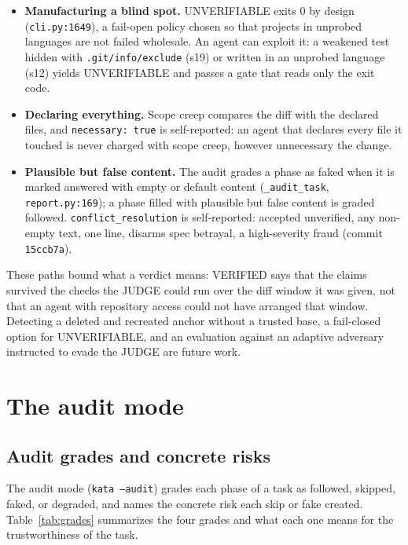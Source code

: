 \documentclass{sbc2019}%
\begin{document}
\begin{itemize}
not close the anchor rewrite above, which we re-ran against it and
which still yielded VERIFIED at that commit.
\item \textbf{Manufacturing a blind spot.} UNVERIFIABLE exits 0 by design
(\texttt{cli.py:1649}), a fail-open policy chosen so that projects in
unprobed languages are not failed wholesale. An agent can exploit it: a
weakened test hidden with \texttt{.git/info/exclude} (s19) or written in an
unprobed language (s12) yields UNVERIFIABLE and passes a gate that reads only
the exit code.
\item \textbf{Declaring everything.} Scope creep compares the diff with the
declared files, and \texttt{necessary: true} is self-reported: an agent that
declares every file it touched is never charged with scope creep, however
unnecessary the change.
\item \textbf{Plausible but false content.} The audit grades a phase as faked
when it is marked answered with empty or default content
(\texttt{\_audit\_task}, \texttt{report.py:169}); a phase filled with
plausible but false content is graded followed. \texttt{conflict\_resolution} is self-reported: accepted unverified, any non-empty
text, one line, disarms spec betrayal, a high-severity fraud
(commit \texttt{15ccb7a}).
\end{itemize}

These paths bound what a verdict means: VERIFIED says that the claims
survived the checks the JUDGE could run over the diff window it was given,
not that an agent with repository access could not have arranged that
window. Detecting a deleted and recreated anchor without a trusted base, a
fail-closed option for UNVERIFIABLE, and an evaluation against an
adaptive adversary instructed to evade the JUDGE are future work.

\section{The audit mode}
\label{sec:audit}

\subsection{Audit grades and concrete risks}

The audit mode (\texttt{kata --audit}) grades each phase of a task as
followed, skipped, faked, or degraded, and names the concrete risk each
skip or fake created. Table~\ref{tab:grades} summarizes the four grades
and what each one means for the trustworthiness of the task.
\end{document}
